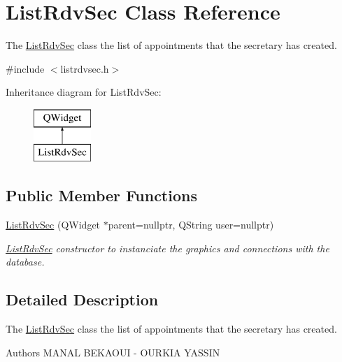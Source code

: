 \hypertarget{class_list_rdv_sec}{}\section{List\+Rdv\+Sec Class Reference}
\label{class_list_rdv_sec}


The \mbox{\hyperlink{class_list_rdv_sec}{List\+Rdv\+Sec}} class the list of appointments that the secretary has created.  




{\ttfamily \#include $<$listrdvsec.\+h$>$}

Inheritance diagram for List\+Rdv\+Sec\+:\begin{figure}[H]
\begin{center}
\leavevmode
\includegraphics[height=2.000000cm]{class_list_rdv_sec}
\end{center}
\end{figure}
\subsection*{Public Member Functions}
\begin{DoxyCompactItemize}
\item 
\mbox{\hyperlink{class_list_rdv_sec_a76dafffd7b1fd45d6e60389365960434}{List\+Rdv\+Sec}} (Q\+Widget $\ast$parent=nullptr, Q\+String user=nullptr)
\begin{DoxyCompactList}\small\item\em \mbox{\hyperlink{class_list_rdv_sec}{List\+Rdv\+Sec}} constructor to instanciate the graphics and connections with the database. \end{DoxyCompactList}\end{DoxyCompactItemize}


\subsection{Detailed Description}
The \mbox{\hyperlink{class_list_rdv_sec}{List\+Rdv\+Sec}} class the list of appointments that the secretary has created. 

\begin{DoxyAuthor}{Authors}
M\+A\+N\+AL B\+E\+K\+A\+O\+UI -\/ O\+U\+R\+K\+IA Y\+A\+S\+S\+IN 
\end{DoxyAuthor}


